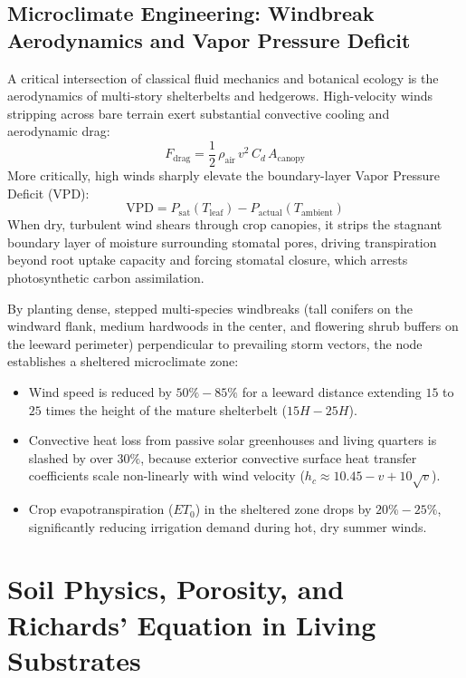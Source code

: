 \subsection{Microclimate Engineering: Windbreak Aerodynamics and Vapor Pressure Deficit}
A critical intersection of classical fluid mechanics and botanical ecology is the aerodynamics of multi-story shelterbelts and hedgerows. High-velocity winds stripping across bare terrain exert substantial convective cooling and aerodynamic drag:
\begin{equation}
F_{\mathrm{drag}} = \frac{1}{2} \, \rho_{\mathrm{air}} \, v^2 \, C_d \, A_{\mathrm{canopy}}
\label{eq:wind_drag}
\end{equation}
More critically, high winds sharply elevate the boundary-layer Vapor Pressure Deficit (VPD):
\begin{equation}
\mathrm{VPD} = P_{\mathrm{sat}}(T_{\mathrm{leaf}}) - P_{\mathrm{actual}}(T_{\mathrm{ambient}})
\label{eq:vpd_definition}
\end{equation}
When dry, turbulent wind shears through crop canopies, it strips the stagnant boundary layer of moisture surrounding stomatal pores, driving transpiration beyond root uptake capacity and forcing stomatal closure, which arrests photosynthetic carbon assimilation.

By planting dense, stepped multi-species windbreaks (tall conifers on the windward flank, medium hardwoods in the center, and flowering shrub buffers on the leeward perimeter) perpendicular to prevailing storm vectors, the node establishes a sheltered microclimate zone:
\begin{itemize}
    \item Wind speed is reduced by $50\% - 85\%$ for a leeward distance extending $15$ to $25$ times the height of the mature shelterbelt ($15H - 25H$).
    \item Convective heat loss from passive solar greenhouses and living quarters is slashed by over $30\%$, because exterior convective surface heat transfer coefficients scale non-linearly with wind velocity ($h_c \approx 10.45 - v + 10 \sqrt{v}$).
    \item Crop evapotranspiration ($ET_0$) in the sheltered zone drops by $20\% - 25\%$, significantly reducing irrigation demand during hot, dry summer winds.
\end{itemize}

\section{Soil Physics, Porosity, and Richards' Equation in Living Substrates}
\label{sec:soil_physics_richards}

